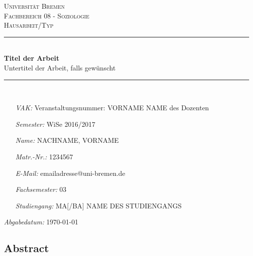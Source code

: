 \begin{titlepage}
\thispagestyle{empty}
\newcommand{\HRule}{\rule{\linewidth}{0.5mm}}
\hspace{1cm}
\center

\textsc{\huge Universität Bremen}\\[2.0cm]
\textsc{\Large Fachbereich 08 - Soziologie}\\[0.8cm]
\MSonehalfspacing
\textsc{\Large Hausarbeit/Typ}\\[1.0cm]

\HRule\\[1.4cm]
\MSdoublespacing
{ \huge \bfseries Titel der Arbeit}\\[0.2cm]
{ \large Untertitel der Arbeit, falls gewünscht}\\[0.3cm] %
\HRule \\[2.4cm]
\MSonehalfspacing

\begin{minipage}[t]{0.8\textwidth}
	\begin{itemize}
	\item[\emph{VAK:}] Veranstaltungsnummer: VORNAME NAME des Dozenten
	\item[\emph{Semester:}] WiSe 2016/2017
	\item[\emph{Name:}] NACHNAME, VORNAME
	\item[\emph{Matr.-Nr.:}] 1234567
	\item[\emph{E-Mail:}] emailadresse@uni-bremen.de
	\item[\emph{Fachsemester:}] 03
	\item[\emph{Studiengang:}] MA[/BA] NAME DES STUDIENGANGS
	\end{itemize}
\end{minipage}

\vspace{2.9cm}

\flushright \emph{Abgabedatum:} \today
\end{titlepage}
\restoregeometry
{}
\pagestyle{empty}
\newpage

\MSonehalfspacing
\hspace{0pt}
\vfill
\begin{center}
\section*{Abstract}
\end{center} 

\vfill
\hspace{0pt}
\newpage

